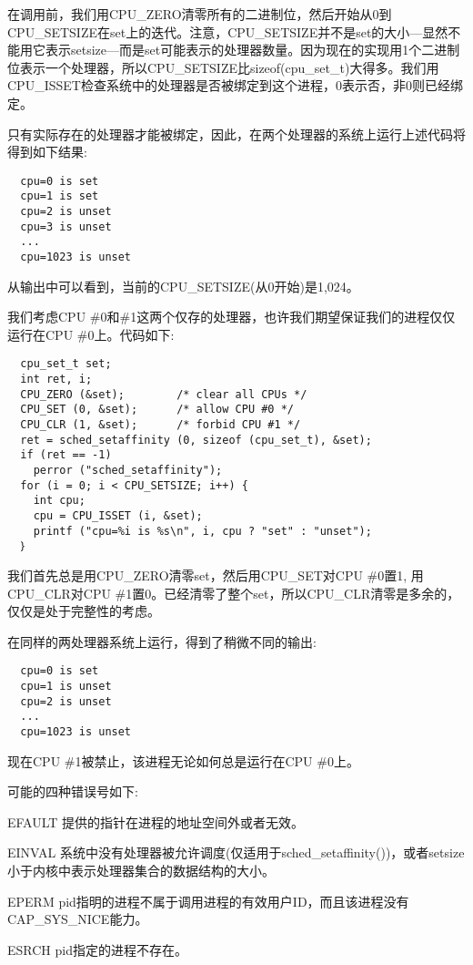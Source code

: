 在调用前，我们用CPU\_ZERO清零所有的二进制位，然后开始从0到CPU\_SETSIZE在set上的迭代。注意，CPU\_SETSIZE并不是set的大小---显然不能用它表示setsize---而是set可能表示的处理器数量。因为现在的实现用1个二进制位表示一个处理器，所以CPU\_SETSIZE比sizeof(cpu\_set\_t)大得多。我们用CPU\_ISSET检查系统中的处理器是否被绑定到这个进程，0表示否，非0则已经绑定。

只有实际存在的处理器才能被绑定，因此，在两个处理器的系统上运行上述代码将得到如下结果:

\begin{verbatim}
  cpu=0 is set
  cpu=1 is set
  cpu=2 is unset
  cpu=3 is unset
  ...
  cpu=1023 is unset
\end{verbatim}

从输出中可以看到，当前的CPU\_SETSIZE(从0开始)是1,024。

我们考虑CPU \#0和\#1这两个仅存的处理器，也许我们期望保证我们的进程仅仅运行在CPU \#0上。代码如下:

\begin{lstlisting}
  cpu_set_t set;
  int ret, i;
  CPU_ZERO (&set);        /* clear all CPUs */
  CPU_SET (0, &set);      /* allow CPU #0 */
  CPU_CLR (1, &set);      /* forbid CPU #1 */
  ret = sched_setaffinity (0, sizeof (cpu_set_t), &set);
  if (ret == -1)
    perror ("sched_setaffinity");
  for (i = 0; i < CPU_SETSIZE; i++) {
    int cpu;
    cpu = CPU_ISSET (i, &set);
    printf ("cpu=%i is %s\n", i, cpu ? "set" : "unset");
  ｝
\end{lstlisting}

  我们首先总是用CPU\_ZERO清零set，然后用CPU\_SET对CPU \#0置1, 用CPU\_CLR对CPU \#1置0。已经清零了整个set，所以CPU\_CLR清零是多余的，仅仅是处于完整性的考虑。

  在同样的两处理器系统上运行，得到了稍微不同的输出:

\begin{verbatim}
  cpu=0 is set
  cpu=1 is unset
  cpu=2 is unset
  ...
  cpu=1023 is unset
\end{verbatim}

  现在CPU \#1被禁止，该进程无论如何总是运行在CPU \#0上。

  可能的四种错误号如下:

\begin{eqlist*}
\item[EFAULT] 提供的指针在进程的地址空间外或者无效。
\item[EINVAL] 系统中没有处理器被允许调度(仅适用于sched\_setaffinity())，或者setsize小于内核中表示处理器集合的数据结构的大小。
\item[EPERM] pid指明的进程不属于调用进程的有效用户ID，而且该进程没有CAP\_SYS\_NICE能力。
\item[ESRCH] pid指定的进程不存在。
\end{eqlist*}

